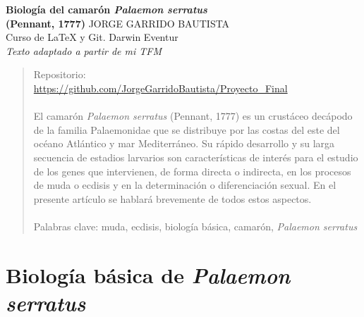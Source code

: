 \documentclass[a4paper]{article}
\begin{document}
\begin{titlepage}
\begin{center}
\vspace*{5\baselineskip} %
{\LARGE \textbf{Biología del camarón \textit{Palaemon serratus}\\(Pennant, 1777)}}
\vspace*{5\baselineskip}
\vfill %
{\large JORGE GARRIDO BAUTISTA}\\[1cm]
Curso de LaTeX y Git. Darwin Eventur\\
\textit{Texto adaptado a partir de mi TFM}
\end{center}
\end{titlepage}

\begin{titlepage}
\begin{abstract}
Repositorio:\\
\url{https://github.com/JorgeGarridoBautista/Proyecto_Final}\\
\\El camarón \textit{Palaemon serratus} (Pennant, 1777) es un crustáceo decápodo de la familia Palaemonidae que se distribuye por las costas del este del océano Atlántico y mar Mediterráneo. Su rápido desarrollo y su larga secuencia de estadios larvarios son características de interés para el estudio de los genes que intervienen, de forma directa o indirecta, en los procesos de muda o ecdisis y en la determinación o diferenciación sexual. En el presente artículo se hablará brevemente de todos estos aspectos.\\
\\Palabras clave: muda, ecdisis, biología básica, camarón, \textit{Palaemon serratus}
\end{abstract}
\end{titlepage}

\begin{titlepage}
\tableofcontents
\end{titlepage}

\section{Biología básica de \textit{Palaemon serratus}}
\end{document}
